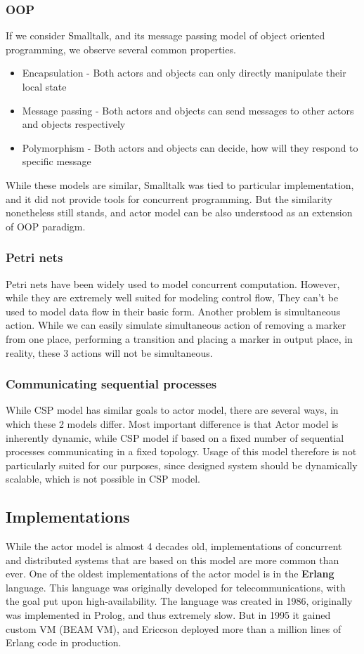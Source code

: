 \subsubsection{OOP}
If we consider Smalltalk, and its message passing model of object oriented programming, we observe several common properties.
\begin{itemize}
    \item Encapsulation - Both actors and objects can only directly manipulate their local state
    \item Message passing - Both actors and objects can send messages to other actors and objects respectively
    \item Polymorphism - Both actors and objects can decide, how will they respond to specific message
\end{itemize}

While these models are similar, Smalltalk was tied to particular implementation, and it did not provide
tools for concurrent programming. But the similarity nonetheless still stands, and actor model can be also understood as
an extension of OOP paradigm.

\subsubsection{Petri nets}
Petri nets have been widely used to model concurrent computation. However, while they are extremely well suited
for modeling control flow, They can't be used to model data flow in their basic form. Another problem is
simultaneous action. While we can easily simulate simultaneous action of removing a marker from one place, performing
a transition and placing a marker in output place, in reality, these 3 actions will not be simultaneous.

\subsubsection{Communicating sequential processes}
While CSP model has similar goals to actor model, there are several ways, in which these 2 models differ.
Most important difference is that Actor model is inherently
dynamic, while CSP model if based on a fixed number of sequential processes communicating in a fixed topology\cite{Hoare:1985:CSP:3921}.
Usage of this model therefore is not particularly suited for our purposes, since designed system should be dynamically scalable,
which is not possible in CSP model.

\subsection{Implementations}
While the actor model is almost 4 decades old, implementations of concurrent and distributed systems that
are based on this model are more common than ever. One of the oldest implementations of the actor model is in the
\textbf{Erlang} language. This language was originally developed for telecommunications, with the goal put upon
high-availability. The language was created in 1986, originally was implemented in Prolog, and thus extremely slow.
But in 1995 it gained custom VM (BEAM VM), and Ericcson deployed more than a million lines of Erlang code in production.

